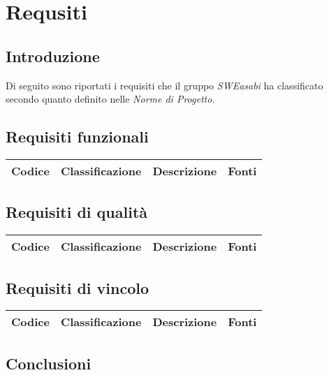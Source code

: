 \chapter{Requsiti}

\section{Introduzione}
Di seguito sono riportati i requisiti che il gruppo \textit{SWEasabi} ha classificato secondo quanto definito nelle \textit{Norme di Progetto}.

\section{Requisiti funzionali}

\begin{center}
    \begin{xltabular}{\linewidth}{|l|l|X|l|}
        Codice & Classificazione & Descrizione & Fonti \\
        \hline
        

        \end{xltabular}
\end{center}


\section{Requisiti di qualità}

\begin{center}
    \begin{xltabular}{\linewidth}{|l|l|X|l|}
    \hline
    Codice & Classificazione & Descrizione & Fonti \\
    \hline

    \end{xltabular}

\end{center}

\section{Requisiti di vincolo}

\begin{center}
    \begin{xltabular}{\linewidth}{|l|l|X|l|}
    \hline
    Codice & Classificazione & Descrizione & Fonti \\
    \hline

    \end{xltabular}
    \end{center}

\section{Conclusioni}